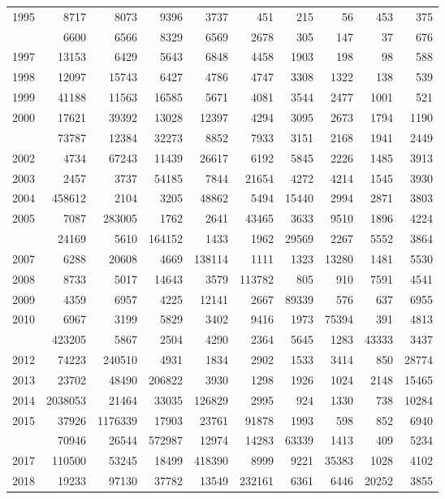 \documentclass[
]{article}
\begin{document}
\begin{longtable}[t]{lrrrrrrrrr}
1995 & 8717 & 8073 & 9396 & 3737 & 451 & 215 & 56 & 453 & 375\\
\addlinespace
1996 & 6600 & 6566 & 8329 & 6569 & 2678 & 305 & 147 & 37 & 676\\
1997 & 13153 & 6429 & 5643 & 6848 & 4458 & 1903 & 198 & 98 & 588\\
1998 & 12097 & 15743 & 6427 & 4786 & 4747 & 3308 & 1322 & 138 & 539\\
1999 & 41188 & 11563 & 16585 & 5671 & 4081 & 3544 & 2477 & 1001 & 521\\
2000 & 17621 & 39392 & 13028 & 12397 & 4294 & 3095 & 2673 & 1794 & 1190\\
\addlinespace
2001 & 73787 & 12384 & 32273 & 8852 & 7933 & 3151 & 2168 & 1941 & 2449\\
2002 & 4734 & 67243 & 11439 & 26617 & 6192 & 5845 & 2226 & 1485 & 3913\\
2003 & 2457 & 3737 & 54185 & 7844 & 21654 & 4272 & 4214 & 1545 & 3930\\
2004 & 458612 & 2104 & 3205 & 48862 & 5494 & 15440 & 2994 & 2871 & 3803\\
2005 & 7087 & 283005 & 1762 & 2641 & 43465 & 3633 & 9510 & 1896 & 4224\\
\addlinespace
2006 & 24169 & 5610 & 164152 & 1433 & 1962 & 29569 & 2267 & 5552 & 3864\\
2007 & 6288 & 20608 & 4669 & 138114 & 1111 & 1323 & 13280 & 1481 & 5530\\
2008 & 8733 & 5017 & 14643 & 3579 & 113782 & 805 & 910 & 7591 & 4541\\
2009 & 4359 & 6957 & 4225 & 12141 & 2667 & 89339 & 576 & 637 & 6955\\
2010 & 6967 & 3199 & 5829 & 3402 & 9416 & 1973 & 75394 & 391 & 4813\\
\addlinespace
2011 & 423205 & 5867 & 2504 & 4290 & 2364 & 5645 & 1283 & 43333 & 3437\\
2012 & 74223 & 240510 & 4931 & 1834 & 2902 & 1533 & 3414 & 850 & 28774\\
2013 & 23702 & 48490 & 206822 & 3930 & 1298 & 1926 & 1024 & 2148 & 15465\\
2014 & 2038053 & 21464 & 33035 & 126829 & 2995 & 924 & 1330 & 738 & 10284\\
2015 & 37926 & 1176339 & 17903 & 23761 & 91878 & 1993 & 598 & 852 & 6940\\
\addlinespace
2016 & 70946 & 26544 & 572987 & 12974 & 14283 & 63339 & 1413 & 409 & 5234\\
2017 & 110500 & 53245 & 18499 & 418390 & 8999 & 9221 & 35383 & 1028 & 4102\\
2018 & 19233 & 97130 & 37782 & 13549 & 232161 & 6361 & 6446 & 20252 & 3855\\*
\end{longtable}
\end{document}
